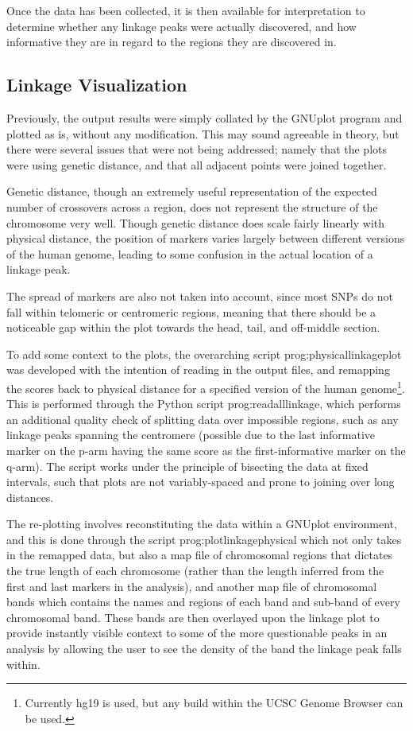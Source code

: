 Once the data has been collected, it is then available for interpretation to determine whether any linkage peaks were actually discovered, and how informative they are in regard to the regions they are discovered in.

\subsection{Linkage Visualization}

Previously, the output results were simply collated by the GNUplot program and plotted as is, without any modification. This may sound agreeable in theory, but there were several issues that were not being addressed; namely that the plots were using genetic distance, and that all adjacent points were joined together.

Genetic distance, though an extremely  useful representation of the expected number of crossovers across a region, does not represent the structure of the chromosome very well. Though genetic distance does scale fairly linearly with physical distance, the position of markers varies largely between different versions of the human genome, leading to some confusion in the actual location of a linkage peak.

The spread of markers are also not taken into account, since most SNPs do not fall within telomeric or centromeric regions, meaning that there should be a noticeable gap within the plot towards the head, tail, and off-middle section.

To add some context to the plots, the overarching script \gls{prog:physicallinkageplot} was developed with the intention of reading in the output files, and remapping the scores back to physical distance for a specified version of the human genome\footnote{Currently hg19 is used, but any build within the UCSC Genome Browser can be used.}. This is performed through the Python script \gls{prog:readalllinkage}, which performs an additional quality check of splitting data over impossible regions, such as any linkage peaks spanning the centromere (possible due to the last informative marker on the p-arm having the same score as the first-informative marker on the q-arm). The script works under the principle of bisecting the data at fixed intervals, such that plots are not variably-spaced and prone to joining over long distances.

The re-plotting involves reconstituting the data within a GNUplot  environment, and this is done through the script \gls{prog:plotlinkagephysical} which not only takes in the remapped data, but also a map file of chromosomal regions that dictates the true length of each chromosome (rather than the length inferred from the first and last markers in the analysis), and another map file of chromosomal bands which contains the names and regions of each band and sub-band of every chromosomal band. These bands are then overlayed upon the linkage plot to provide instantly visible context to some of the more questionable peaks in an analysis by allowing the user to see the density of the band the linkage peak falls within.


